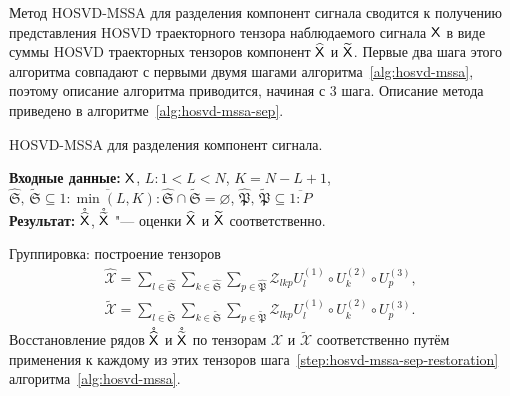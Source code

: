 \documentclass[specialist,
  substylefile=spbu.rtx,
subf,href,colorlinks=true, 12pt]{disser}
\theoremstyle{plain}
\theoremstyle{definition}
\theoremstyle{remark}
\newcommand{\Input}{\textbf{Входные данные: }}
\newcommand{\Output}{\textbf{Результат: }}
\begin{document}
Метод HOSVD-MSSA для разделения компонент сигнала сводится к получению представления HOSVD траекторного тензора
наблюдаемого сигнала $\mathsf{X}$ в виде суммы HOSVD траекторных тензоров компонент $\widehat{\mathsf{X}}$ и $\widetilde{\mathsf{X}}$.
Первые два шага этого алгоритма совпадают с первыми двумя шагами алгоритма~\ref{alg:hosvd-mssa}, поэтому
описание алгоритма приводится, начиная с 3 шага.
Описание метода приведено в алгоритме~\ref{alg:hosvd-mssa-sep}.

\begin{algorithm}[!ht]
  \caption{HOSVD-MSSA для разделения компонент сигнала.}
  \label{alg:hosvd-mssa-sep}
  \Input $\mathsf{X}$,
  $L: 1< L < N$, $K = N - L + 1$,
  $\widehat{\mathfrak{S}},\, \widetilde{\mathfrak{S}} \subseteq \overline{1:\min(L, K)}:
  \widehat{\mathfrak{S}} \cap \widetilde{\mathfrak{S}} = \varnothing$,
  $\widehat{\mathfrak{P}},\, \widetilde{\mathfrak{P}}  \subseteq \overline{1:P}$\\
  \Output $\mathring{\widehat{\mathsf{X}}}$, $\mathring{\widetilde{\mathsf{X}}}$ "--- оценки $\widehat{\mathsf{X}}$ и $\widetilde{\mathsf{X}}$
  соответственно.
  \begin{algorithmic}[1]
    \setcounter{ALG@line}{2}
    \State Группировка: построение тензоров
    \begin{gather*}
      \widehat{\mathcal{X}}=\sum_{l \in \widehat{\mathfrak{S}}} \sum_{k\in \widehat{\mathfrak{S}}}
      \sum_{p\in \widehat{\mathfrak{P}}}
      \mathcal{Z}_{lkp} U^{(1)}_{l}\circ U^{(2)}_{k} \circ U^{(3)}_{p},\\
      \widetilde{\mathcal{X}}=\sum_{l \in \widetilde{\mathfrak{S}}} \sum_{k\in \widetilde{\mathfrak{S}}}
      \sum_{p\in \widetilde{\mathfrak{P}}}
      \mathcal{Z}_{lkp} U^{(1)}_{l}\circ U^{(2)}_{k} \circ U^{(3)}_{p}.
    \end{gather*}
    \State Восстановление рядов $\mathring{\widehat{\mathsf{X}}}$ и $\mathring{\widetilde{\mathsf{X}}}$ по тензорам $\widehat{\mathcal{X}}$ и $\widetilde{\mathcal{X}}$ соответственно путём применения к
    каждому из этих тензоров шага~\ref{step:hosvd-mssa-sep-restoration} алгоритма~\ref{alg:hosvd-mssa}.
  \end{algorithmic}
\end{algorithm}
\end{document}
